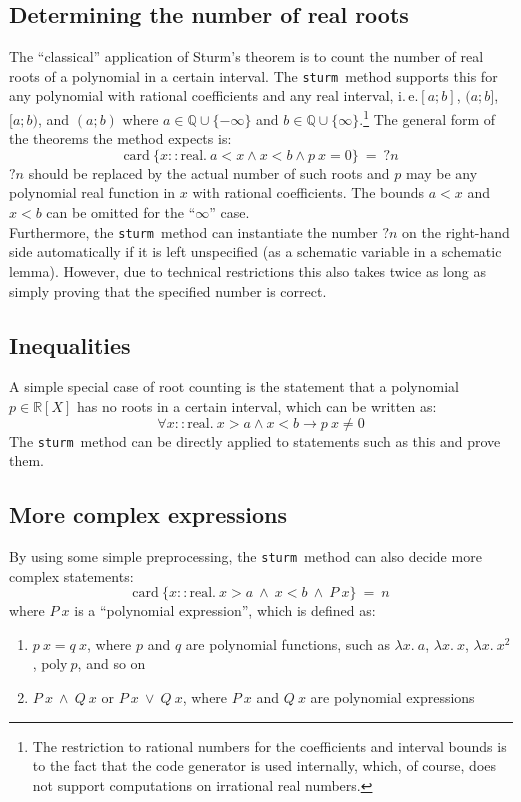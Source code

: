 \documentclass[11pt,a4paper,oneside]{article}
\newcommand{\ie}{i.\,e.}
\newcommand{\RR}{\mathbb{R}}
\newcommand{\QQ}{\mathbb{Q}}
\newcommand{\sturm}{\texttt{sturm}}
\newcommand{\card}{\textrm{card}}
\newcommand{\real}{\textrm{real}}
\begin{document}
\subsection{Determining the number of real roots}
The \enquote{classical} application of Sturm's theorem is to count the number of real roots of a polynomial in a certain interval. The \sturm\ method supports this for any polynomial with rational coefficients and any real interval, \ie $[a;b]$, $(a;b]$, $[a;b)$, and $(a;b)$ where $a\in\QQ\cup\{-\infty\}$ and $b\in\QQ\cup\{\infty\}$.\footnote{The restriction to rational numbers for the coefficients and interval bounds is to the fact that the code generator is used internally, which, of course, does not support computations on irrational real numbers.} The general form of the theorems the method expects is:
$$\card\ \{x::\real.\ a < x \wedge x < b \wedge p\ x = 0\}\ =\ ?n$$
$?n$ should be replaced by the actual number of such roots and $p$ may be any polynomial real function in $x$ with rational coefficients. The bounds $a < x$ and $x < b$ can be omitted for the \enquote{$\infty$} case.\\

Furthermore, the \sturm\ method can instantiate the number $?n$ on the right-hand side automatically if it is left unspecified (as a schematic variable in a schematic lemma). However, due to technical restrictions this also takes twice as long as simply proving that the specified number is correct.

\newpage
\subsection{Inequalities}

A simple special case of root counting is the statement that a polynomial $p\in\RR[X]$ has no roots in a certain interval, which can be written as:
$$\forall x::\real.\ x > a \wedge x < b \longrightarrow p\ x \neq 0$$
The \sturm\ method can be directly applied to statements such as this and prove them.

\subsection{More complex expressions}

By using some simple preprocessing, the \sturm\ method can also decide more complex statements:
$$\card\ \{x::\real.\ x > a\ \wedge\ x < b\ \wedge\ P\ x\}\ =\ n$$
where $P\ x$ is a \enquote{polynomial expression}, which is defined as:
\begin{enumerate}
\item $p\ x= q\ x$, where $p$ and $q$ are polynomial functions, such as $\lambda x.\ a$, $\lambda x.\ x$, $\lambda x.\ x^2$, $\mathrm{poly}\ p$, and so on
\item $P\ x\ \wedge\ Q\ x$ or $P\ x\ \vee\ Q\ x$, where $P\ x$ and $Q\ x$ are polynomial expressions
\end{enumerate}
\end{document}
